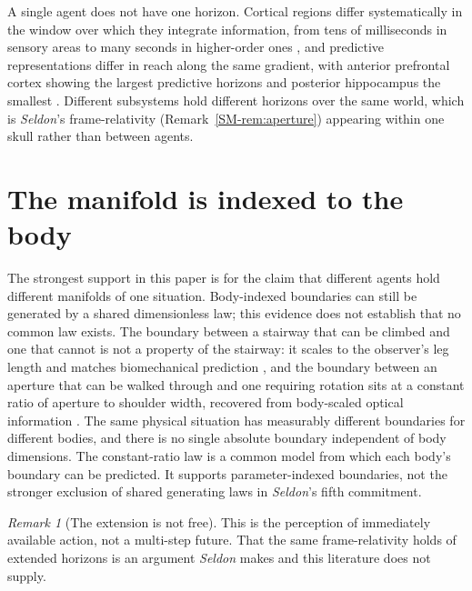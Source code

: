 \documentclass[11pt,a4paper]{article}
\theoremstyle{remark}
\newtheorem{remark}{Remark}[section]
\begin{document}
A single agent does not have one horizon. Cortical regions differ systematically in the window over
which they integrate information, from tens of milliseconds in sensory areas to many seconds in
higher-order ones \citep{hasson2008,hasson2015}, and predictive representations differ in reach
along the same gradient, with anterior prefrontal cortex showing the largest predictive horizons and
posterior hippocampus the smallest \citep{brunec2022}. Different subsystems hold different horizons
over the same world, which is \emph{Seldon}'s frame-relativity (Remark~\ref{SM-rem:aperture})
appearing within one skull rather than between agents.

\section{The manifold is indexed to the body}\label{sec:body}
The strongest support in this paper is for the claim that different agents hold different manifolds
of one situation. Body-indexed boundaries can still be generated by a shared dimensionless law; this evidence does not establish that no common law exists. The boundary between a
stairway that can be climbed and one that cannot is not a property of the stairway: it scales to the
observer's leg length and matches biomechanical prediction \citep{warren1984}, and the boundary
between an aperture that can be walked through and one requiring rotation sits at a constant ratio
of aperture to shoulder width, recovered from body-scaled optical information \citep{warrenwhang1987}.
The same physical situation has measurably different boundaries for different bodies, and there is no
single absolute boundary independent of body dimensions. The constant-ratio law is a common model from which each body's boundary can be predicted. It supports parameter-indexed boundaries, not the stronger exclusion of shared generating laws in \emph{Seldon}'s fifth commitment.

\begin{remark}[The extension is not free]\label{rem:affordance-limit}
This is the perception of immediately available action, not a multi-step future. That the same
frame-relativity holds of extended horizons is an argument \emph{Seldon} makes and this
literature does not supply.
\end{remark}
\end{document}
